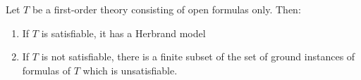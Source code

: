 \documentclass[12pt]{article}
\begin{document}
Let $T$ be a first-order theory consisting of open formulas only.  Then:

\begin{enumerate}
\item If $T$ is satisfiable, it has a Herbrand model
\item If $T$ is not satisfiable, there is a finite subset of the set of ground instances of formulas of $T$ which is unsatisfiable.
\end{enumerate}
\end{document}
